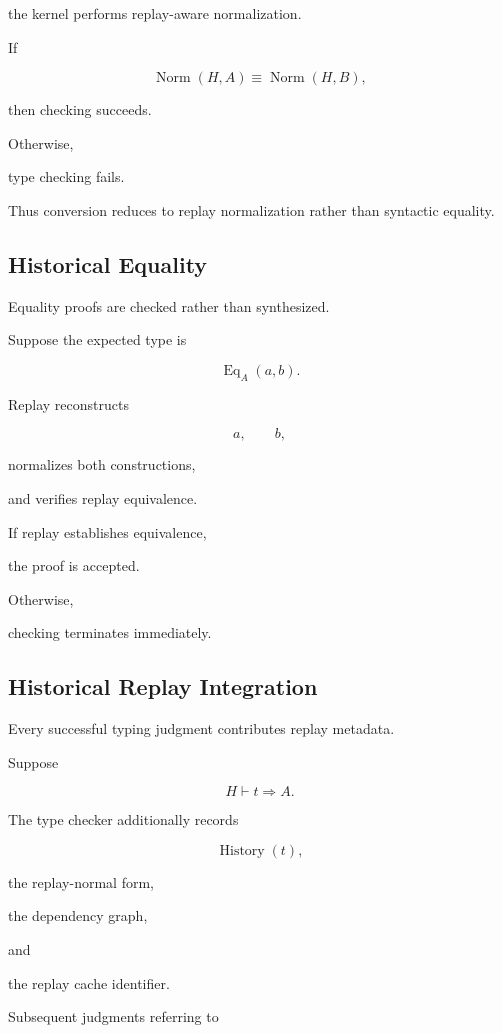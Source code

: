 \documentclass[12pt,oneside]{article}
\theoremstyle{definition}
\theoremstyle{remark}
\DeclareMathOperator{\History}{History}
\begin{document}
the kernel performs replay-aware normalization.

If

\[
\operatorname{Norm}(H,A)
\equiv
\operatorname{Norm}(H,B),
\]

then checking succeeds.

Otherwise,

type checking fails.

Thus conversion reduces to replay normalization rather than syntactic equality.


\subsection{Historical Equality}

Equality proofs are checked rather than synthesized.

Suppose the expected type is

\[
\operatorname{Eq}_A(a,b).
\]

Replay reconstructs

\[
a,
\qquad
b,
\]

normalizes both constructions,

and verifies replay equivalence.

If replay establishes equivalence,

the proof is accepted.

Otherwise,

checking terminates immediately.


\subsection{Historical Replay Integration}

Every successful typing judgment contributes replay metadata.

Suppose

\[
H
\vdash
t
\Rightarrow
A.
\]

The type checker additionally records

\[
\History(t),
\]

the replay-normal form,

the dependency graph,

and

the replay cache identifier.

Subsequent judgments referring to
\end{document}
